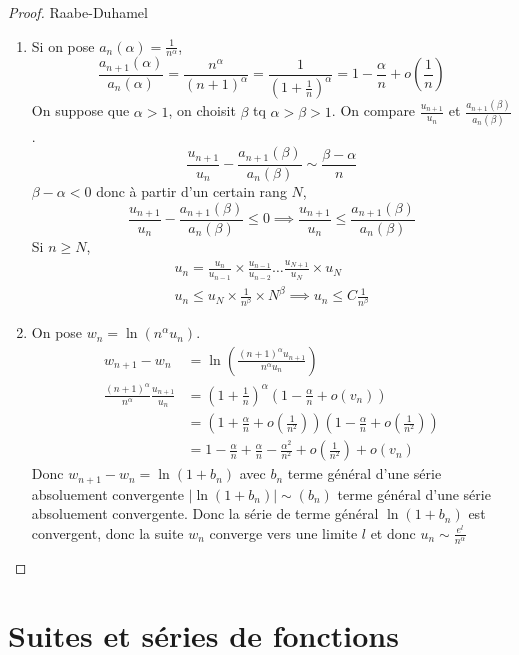 \documentclass[]{report}
\begin{document}
\begin{proof}{Raabe-Duhamel}{}
    \begin{enumerate}
        \item Si on pose $a_n(\alpha)=\frac{1}{n^\alpha}$,
        \[\frac{a_{n+1}(\alpha)}{a_n(\alpha)}=\frac{n^\alpha}{(n+1)^\alpha}=\frac{1}{\left(1+\frac{1}{n}\right)^\alpha}=1-\frac{\alpha}{n}+o\left(\frac{1}{n}\right)\]
        On suppose que $\alpha>1$, on choisit $\beta$ tq $\alpha>\beta>1$. On compare $\frac{u_{n+1}}{u_n}$ et $\frac{a_{n+1}(\beta)}{a_n(\beta)}$.
        \[\frac{u_{n+1}}{u_n}-\frac{a_{n+1}(\beta)}{a_n(\beta)}\sim \frac{\beta-\alpha}{n}\]
        $\beta-\alpha<0$ donc à partir d'un certain rang $N$,
        \[\frac{u_{n+1}}{u_n}-\frac{a_{n+1}(\beta)}{a_n(\beta)}\le 0\implies \frac{u_{n+1}}{u_n}\le \frac{a_{n+1}(\beta)}{a_n(\beta)}\]
        Si $n\ge N$,
        \begin{align*}
            u_n=\frac{u_n}{u_{n-1}}\times \frac{u_{n-1}}{u_{n-2}}\ldots \frac{u_{N+1}}{u_N}\times u_N\\
            u_n\le u_N\times \frac{1}{n^\beta}\times N^\beta\implies u_n\le C\frac{1}{n^\beta}
        \end{align*}
        \item On pose $w_n=\ln \left(n^\alpha u_n\right)$.\\
        \begin{align*}
            w_{n+1}-w_n&=\ln \left(\frac{(n+1)^\alpha u_{n+1}}{n^\alpha u_n}\right)\\
            \frac{(n+1)^\alpha}{n^\alpha}\frac{u_{n+1}}{u_n}&=\left(1+\frac{1}{n}\right)^\alpha \left(1-\frac{\alpha}{n}+o(v_n)\right)\\
            &=\left(1+\frac{\alpha}{n}+o\left(\frac{1}{n^2}\right)\right)\left(1-\frac{\alpha}{n}+o\left(\frac{1}{n^2}\right)\right)\\
            &=1-\frac{\alpha}{n}+\frac{\alpha}{n}-\frac{\alpha^2}{n^2}+o\left(\frac{1}{n^2}\right)+o(v_n)
        \end{align*}
        Donc $w_{n+1}-w_n=\ln\left(1+b_n\right)$ avec $b_n$ terme général d'une série absoluement convergente
        $|\ln(1+b_n)|\sim (b_n)$ terme général d'une série absoluement convergente. Donc la série de terme général $\ln (1+b_n)$ est convergent, donc la suite $w_n$ converge vers une limite $l$ et donc $u_n\sim \frac{e^l}{n^\alpha}$
    \end{enumerate}
\end{proof}

\chapter{Suites et séries de fonctions}
\end{document}
